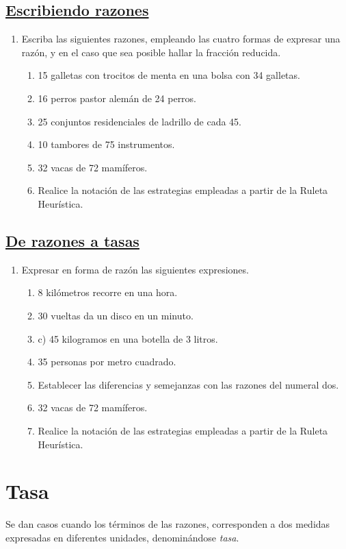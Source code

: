\documentclass[10pt,twoside]{article}
\begin{document}
 \subsection*{\underline{Escribiendo razones}}
 \begin{enumerate}
 \item Escriba las siguientes razones, empleando las cuatro formas de expresar una razón, y en el caso que sea posible hallar la fracción reducida.
 \begin{enumerate}
 \item 15 galletas con trocitos de menta en una bolsa con 34 galletas.
 \item 16 perros pastor alemán de 24 perros.
 \item 25 conjuntos residenciales de ladrillo de cada 45.
 \item 10 tambores de 75 instrumentos.
 \item 32 vacas de 72 mamíferos.
 \item Realice la notación de las estrategias empleadas a partir de la Ruleta Heurística.
 \end{enumerate}
 \end{enumerate}
 \subsection*{\underline{De razones a tasas}}
 \begin{enumerate}
 \item Expresar en forma de razón las siguientes expresiones.
 \begin{enumerate}
 \item 8 kilómetros recorre en una  hora.
 \item 30 vueltas da un disco en un minuto.
 \item c) 45 kilogramos en una botella de 3 litros.
 \item 35 personas por metro cuadrado.
 \item Establecer las diferencias y semejanzas con las razones del numeral dos.
 \item 32 vacas de 72 mamíferos.
 \item Realice la notación de las estrategias empleadas a partir de la Ruleta Heurística.
 \end{enumerate}
  \end{enumerate}
\section*{Tasa}
Se dan casos cuando los términos de las razones, corresponden a dos medidas expresadas en diferentes unidades, denominándose \emph{tasa}.
\end{document}
